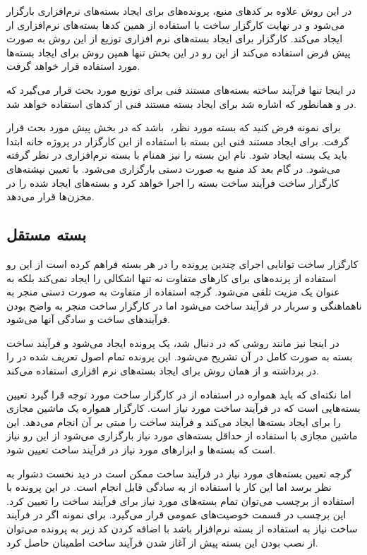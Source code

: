 در این روش علاوه بر کدهای منبع، پرونده‌های  برای ایجاد بسته‌های
نرم‌افزاری بارگزار می‌شود و در نهایت کارگزار ساخت با استفاده از همین کدها
بسته‌های نرم‌افزاری ار ایجاد می‌کند. کارگزار برای ایجاد بسته‌های نرم افزاری
توزیع  از این روش به صورت پیش فرض استفاده می‌کند از این رو در این
بخش تنها همین روش برای ایجاد بسته‌ها مورد استفاده قرار خواهد گرفت.

در اینجا تنها فرآیند ساخته بسته‌های مستند فنی برای توزیع  مورد بحث
قرار می‌گیرد که در و همانطور که اشاره شد برای ایجاد بسته مستند فنی از کدهای
 استفاده خواهد شد.

برای نمونه فرض کنید که بسته مورد نظر، ‌ باشد که در بخش پیش مورد بحث
قرار گرفت. برای ایجاد مستند فنی این بسته با استفاده از این کارگزار در پروژه خانه
ابتدا باید یک بسته ایجاد شود. نام این بسته را نیز همنام با بسته نرم‌افزاری در
نظر گرفته می‌شود. در گام بعد کد منبع به صورت دستی بارگزاری می‌شود. با تعیین
نپشته‌های  کارگزار ساخت فرآیند ساخت بسته را اجرا خواهد کرد و بسته‌های
ایجاد شده را در مخزن‌ها قرار می‌دهد.

\subsection{بسته مستقل}

کارگزار ساخت  توانایی اجرای چندین پرونده  را در هر بسته
فراهم کرده است از این رو استفاده از پرنده‌های  برای کارهای متفاوت نه
تنها اشکالی را ایجاد نمی‌کند بلکه به عنوان یک مزیت تلقی می‌شود. گرچه استفاده از
 متفاوت به صورت دستی منجر به ناهماهنگی و سربار در فرآیند ساخت می‌شود
اما در کارگزار ساخت منجر به واضح بودن فرآیندهای ساخت و سادگی آنها می‌شود.

در اینجا نیز مانند روشی که در  دنبال شد، یک پرونده  ایجاد
می‌شود و فرآیند ساخت بسته به صورت کامل در آن تشریح می‌شود. این پرونده تمام اصول
تعریف شده در  را در برداشته و از همان روش برای ایجاد بسته‌های نرم افزاری
استفاده می‌کند.

اما نکته‌ای که باید همواره در استفاده از  در کارگزار ساخت مورد توجه قرا
گیرد تعیین بسته‌هایی است که در فرآیند ساخت مورد نیاز است. کارگزار همواره یک
ماشین مجازی را برای ایجاد بسته‌ها ایجاد می‌کند و فرآیند ساخت را مبتی بر آن انجام
می‌دهد. این ماشین مجازی با استفاده از حداقل بسته‌های مورد نیاز بارگزاری می‌شود
از این رو نیاز است که بسته‌ها و ابزارهای مورد نیاز در فرآیند ساخت تعیین شود.

گرچه تعیین بسته‌های مورد نیاز در فرآیند ساخت ممکن است در دید نخست دشوار به نظر
برسد اما این کار با استفاده از  به سادگی قابل انجام است. در این پرونده
با استفاده از برچسب  می‌توان تمام بسته‌های مورد نیاز برای
فرآیند ساخت را تعیین کرد. این برچسب در قسمت خوصیت‌های عمومی  قرار
می‌گیرد. برای نمونه اگر در فرآیند ساخت نیاز به استفاده از بسته نرم‌افزار 
باشد با اضافه کردن کد زیر به پرونده  می‌توان از نصب بودن این بسته پیش
از آغاز شدن فرآیند ساخت اطمینان حاصل کرد.

